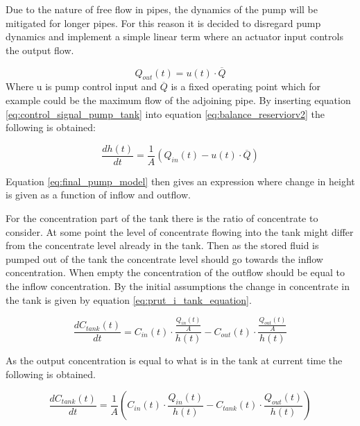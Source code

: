 Due to the nature of free flow in pipes, the dynamics of the pump will be mitigated for longer pipes. For this reason it is decided to disregard pump dynamics and implement a simple linear term where an actuator input controls the output flow.

\begin{equation} \label{eq:control_signal_pump_tank}
	Q_{out}(t) = u(t) \cdot \overline Q
\end{equation}
Where u is pump control input and $\overline Q$ is a fixed operating point which for example could be the maximum flow of the adjoining pipe. By inserting equation \ref{eq:control_signal_pump_tank} into equation \ref{eq:balance_reserviorv2} the following is obtained:

\begin{equation}\label{eq:final_pump_model}
 \boxed{ 	\frac{dh(t)}{dt}=\frac{1}{A} \left(Q_{in}(t)-u(t) \cdot \overline Q \right) }
\end{equation}

Equation \ref{eq:final_pump_model} then gives an expression where change in height is given as a function of inflow and outflow. 

For the concentration part of the tank there is the ratio of concentrate to consider. At some point the level of concentrate flowing into the tank might differ from the concentrate level already in the tank. Then as the stored fluid is pumped out of the tank the concentrate level should go towards the inflow concentration. When empty the concentration of the outflow should be equal to the inflow concentration. By the initial assumptions the change in concentrate in the tank is given by equation \ref{eq:prut_i_tank_equation}.

\begin{equation} \label{eq:prut_i_tank_equation}
	\frac{dC_{tank}(t)}{dt} = C_{in}(t) \cdot \frac{\frac{Q_{in}(t)}{A}}{h(t)} - C_{out}(t) \cdot \frac{\frac{Q_{out}(t)}{A}}{h(t)}   
\end{equation}

As the output concentration is equal to what is in the tank at current time the following is obtained.

\begin{equation} \label{eq:prut_i_tank_equation2}
\boxed{	\frac{dC_{tank}(t)}{dt} = \frac{1}{A} \left(C_{in}(t) \cdot \frac{Q_{in}(t)}{h(t)} - C_{tank}(t) \cdot \frac{Q_{out}(t)}{h(t)} \right) }   
\end{equation}

